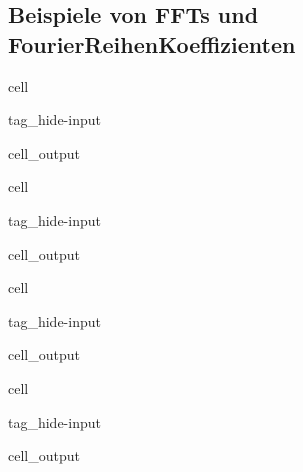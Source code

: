 \documentclass[letterpaper,10pt,english]{jupyterBook}
\begin{document}
\subsection{Beispiele von FFTs und Fourier\sphinxhyphen{}Reihen\sphinxhyphen{}Koeffizienten}
\label{\detokenize{content/3_FourierAnalyse:beispiele-von-ffts-und-fourier-reihen-koeffizienten}}
\begin{sphinxuseclass}{cell}
\begin{sphinxuseclass}{tag_hide-input}\begin{sphinxVerbatimOutput}

\begin{sphinxuseclass}{cell_output}
\noindent{}

\end{sphinxuseclass}\end{sphinxVerbatimOutput}

\end{sphinxuseclass}
\end{sphinxuseclass}
\begin{sphinxuseclass}{cell}
\begin{sphinxuseclass}{tag_hide-input}\begin{sphinxVerbatimOutput}

\begin{sphinxuseclass}{cell_output}
\noindent{}

\end{sphinxuseclass}\end{sphinxVerbatimOutput}

\end{sphinxuseclass}
\end{sphinxuseclass}
\begin{sphinxuseclass}{cell}
\begin{sphinxuseclass}{tag_hide-input}\begin{sphinxVerbatimOutput}

\begin{sphinxuseclass}{cell_output}
\noindent{}

\end{sphinxuseclass}\end{sphinxVerbatimOutput}

\end{sphinxuseclass}
\end{sphinxuseclass}
\begin{sphinxuseclass}{cell}
\begin{sphinxuseclass}{tag_hide-input}\begin{sphinxVerbatimOutput}

\begin{sphinxuseclass}{cell_output}
\noindent{}

\end{sphinxuseclass}\end{sphinxVerbatimOutput}

\end{sphinxuseclass}
\end{sphinxuseclass}
\end{document}
